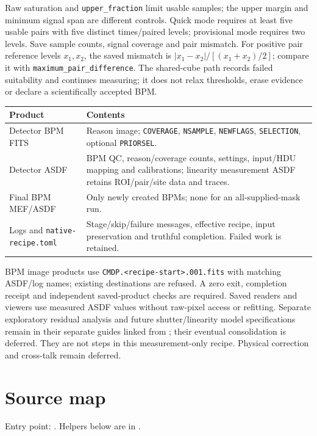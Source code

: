 \documentclass[10pt,a4paper]{article}
\begin{document}
Raw saturation and \texttt{upper\_fraction} limit usable samples; the upper
margin and minimum signal span are different controls. Quick mode requires at
least five usable pairs with five distinct times/paired levels; provisional mode
requires two levels. Save sample counts, signal coverage and pair mismatch.
For positive pair reference levels $x_1,x_2$, the saved mismatch is
$|x_1-x_2|/[(x_1+x_2)/2]$; compare it with
\texttt{maximum\_pair\_difference}. The shared-cube path records failed suitability and continues measuring; it does
not relax thresholds, erase evidence or declare a scientifically accepted BPM.

\begin{tabular}{p{.27\linewidth}p{.66\linewidth}}
\textbf{Product} & \textbf{Contents}\\\hline
Detector BPM FITS & Reason image; \texttt{COVERAGE}, \texttt{NSAMPLE},
\texttt{NEWFLAGS}, \texttt{SELECTION}, optional \texttt{PRIORSEL}.\\
Detector ASDF & BPM QC, reason/coverage counts, settings, input/HDU mapping and
calibrations; linearity measurement ASDF retains ROI/pair/site data and traces.\\
Final BPM MEF/ASDF & Only newly created BPMs; none for an all-supplied-mask run.\\
Logs and \texttt{native-recipe.toml} & Stage/skip/failure messages, effective recipe, input preservation
and truthful completion. Failed work is retained.\\
\end{tabular}

BPM image products use \texttt{CMDP.<recipe-start>.001.fits} with matching ASDF/log names;
existing destinations are refused. A zero exit, completion receipt and independent
saved-product checks are required. Saved readers and viewers use measured ASDF
values without raw-pixel access or refitting. Separate exploratory residual
analysis and future shutter/linearity model specifications remain in their
separate guides linked from ; their eventual
consolidation is deferred. They are not steps in this measurement-only recipe.
Physical correction and cross-talk remain deferred.

\hypertarget{native-recipe}{}
\section*{Source map}
Entry point: .
Helpers below are in .
\end{document}
